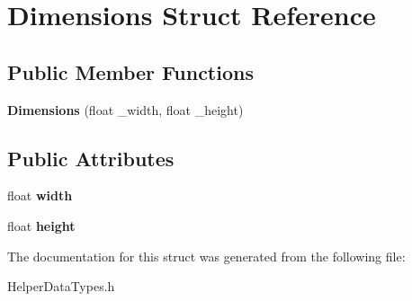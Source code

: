 \hypertarget{struct_dimentions}{}\section{Dimensions Struct Reference}
\label{struct_dimentions}
\subsection*{Public Member Functions}
\begin{DoxyCompactItemize}
\item 
\mbox{\label{struct_dimentions_a09f92ee6239282f5d76c77d87f46f93e}} 
{\bfseries Dimensions} (float \+\_\+width, float \+\_\+height)
\end{DoxyCompactItemize}
\subsection*{Public Attributes}
\begin{DoxyCompactItemize}
\item 
\mbox{\label{struct_dimentions_ab97c472cbe82f80e9a3a4f4c2ad9fe67}} 
float {\bfseries width}
\item 
\mbox{\label{struct_dimentions_a5481fb9860d7b293a20c720c027bae3a}} 
float {\bfseries height}
\end{DoxyCompactItemize}


The documentation for this struct was generated from the following file\+:\begin{DoxyCompactItemize}
\item 
Helper\+Data\+Types.\+h\end{DoxyCompactItemize}
